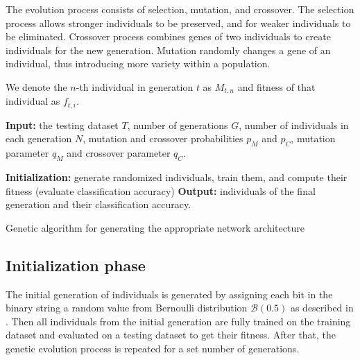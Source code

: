 \documentclass[eng]{simposium}
\begin{document}
The evolution process consists of selection, mutation, and crossover.  
The selection process allows stronger individuals to be preserved, and for weaker individuals to be eliminated. 
Crossover process combines genes of two individuals to create individuals for the new generation. 
Mutation randomly changes a gene of an individual, thus introducing more variety within a population. 

We denote the $n$-th individual in generation $t$ as $M_{t,n}$ and fitness of that individual as $f_{t,i}$. 

\begin{algorithm}[H] 
  \SetAlgoLined 
  \textbf{Input:} the testing dataset $T$, number of generations $G$, number of individuals in each generation $N$, 
  mutation and crossover probabilities $p_M$ and $p_C$, mutation parameter $q_M$ and crossover parameter $q_C$. 

  \textbf{Initialization:} generate randomized individuals, train them, and compute their fitness (evaluate classification accuracy)\; 
    \textbf{Output:} individuals of the final generation and their classification accuracy. 
    \caption{Genetic algorithm for generating the appropriate network architecture} 
\end{algorithm} 

\subsection{Initialization phase} 

The initial generation of individuals is generated by assigning each bit in the binary string a random value from Bernoulli distribution $\mathcal{B}(0.5)$ as described in \cite{4}. 
Then all individuals from the initial generation are fully trained on the training dataset and evaluated on a testing dataset to get their fitness. 
After that, the genetic evolution process is repeated for a set number of generations. 
\end{document}
